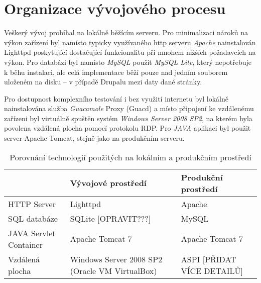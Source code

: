 \chapter{Organizace vývojového procesu}
\label{chap:vyvoj}

Veškerý vývoj probíhal na lokálně běžícím serveru. Pro minimalizaci nároků na výkon zařízení byl namísto typicky využívaného http serveru \emph{Apache} nainstalován Lighttpd poskytující dostačující funkcionalitu při mnohem nižších požadavcích na výkon. Pro databázi byl namísto \emph{MySQL} použit \emph{MySQL Lite}, který nepotřebuje k běhu instalaci, ale celá implementace běží pouze nad jedním souborem uloženém na disku – v případě Drupalu mezi daty dané stránky. 

Pro dostupnost komplexního testování i bez využití internetu byl lokálně nainstalována služba \emph{Guacamole} Proxy (Guacd) a místo připojení ke vzdálenému zařízeni byl virtuálně spuštěn systém \emph{Windows Server 2008 SP2}, na kterém byla povolena vzdálená plocha pomocí protokolu RDP. Pro \emph{JAVA} aplikaci byl použit server Apache Tomcat, stejně jako na produkčním serveru.

\begin{table}
  \caption{Porovnání technologií použitých na lokálním a produkčním prostředí}
  \begin{tabular}{ | p{3cm} | p{4cm} | p{4cm} | }
    \hline  
    & Vývojové prostředí & Produkční prostředí \\ \hline
    HTTP Server & Lighttpd & Apache \\ \hline
    SQL databáze & SQLite [OPRAVIT???] & MySQL \\ \hline
    JAVA Servlet Container & Apache Tomcat 7 & Apache Tomcat 7 \\ \hline
    Vzdálená plocha & Windows Server 2008 SP2 (Oracle VM VirtualBox) & ASPI [PŘIDAT VÍCE DETAILŮ] \\ \hline
  \end{tabular}
\end{table}

